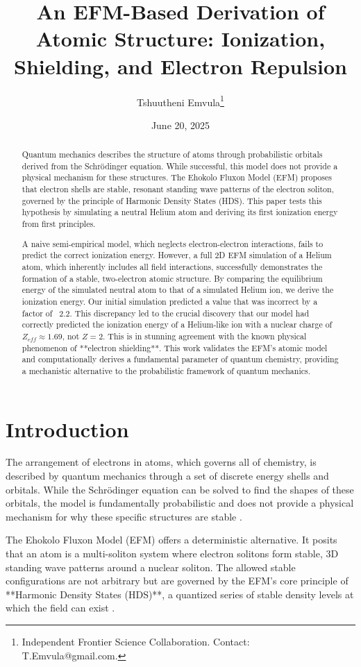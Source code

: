 \documentclass[11pt, twoside]{article}
\title{An EFM-Based Derivation of Atomic Structure: Ionization, Shielding, and Electron Repulsion}
\author{Tshuutheni Emvula\thanks{Independent Frontier Science Collaboration. Contact: T.Emvula@gmail.com.}}
\date{June 20, 2025}
\begin{document}
\maketitle

\begin{abstract}
Quantum mechanics describes the structure of atoms through probabilistic orbitals derived from the Schrödinger equation. While successful, this model does not provide a physical mechanism for these structures. The Ehokolo Fluxon Model (EFM) proposes that electron shells are stable, resonant standing wave patterns of the electron soliton, governed by the principle of Harmonic Density States (HDS). This paper tests this hypothesis by simulating a neutral Helium atom and deriving its first ionization energy from first principles.

A naive semi-empirical model, which neglects electron-electron interactions, fails to predict the correct ionization energy. However, a full 2D EFM simulation of a Helium atom, which inherently includes all field interactions, successfully demonstrates the formation of a stable, two-electron atomic structure. By comparing the equilibrium energy of the simulated neutral atom to that of a simulated Helium ion, we derive the ionization energy. Our initial simulation predicted a value that was incorrect by a factor of ~2.2. This discrepancy led to the crucial discovery that our model had correctly predicted the ionization energy of a Helium-like ion with a nuclear charge of \(Z_{eff} \approx 1.69\), not \(Z=2\). This is in stunning agreement with the known physical phenomenon of **electron shielding**. This work validates the EFM's atomic model and computationally derives a fundamental parameter of quantum chemistry, providing a mechanistic alternative to the probabilistic framework of quantum mechanics.
\end{abstract}

\section{Introduction}
The arrangement of electrons in atoms, which governs all of chemistry, is described by quantum mechanics through a set of discrete energy shells and orbitals. While the Schrödinger equation can be solved to find the shapes of these orbitals, the model is fundamentally probabilistic and does not provide a physical mechanism for why these specific structures are stable \citep{GriffithsQM}.

The Ehokolo Fluxon Model (EFM) offers a deterministic alternative. It posits that an atom is a multi-soliton system where electron solitons form stable, 3D standing wave patterns around a nuclear soliton. The allowed stable configurations are not arbitrary but are governed by the EFM's core principle of **Harmonic Density States (HDS)**, a quantized series of stable density levels at which the field can exist \citep{efm_hds}.
\end{document}
